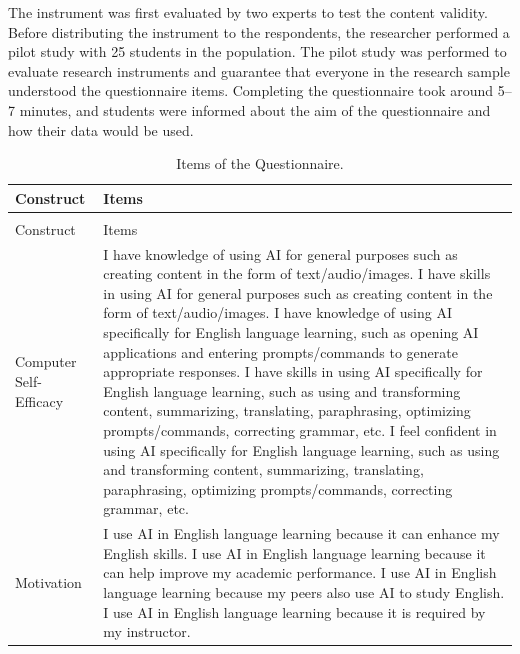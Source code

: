 \documentclass[english]{textolivre}
\begin{document}
The instrument was first evaluated by two experts to test the content validity. Before distributing the instrument to the respondents, the researcher performed a pilot study with 25 students in the population. The pilot study was performed to evaluate research instruments and guarantee that everyone in the research sample understood the questionnaire items. Completing the questionnaire took around 5–7 minutes, and students were informed about the aim of the questionnaire and how their data would be used.

\begin{center}
\begin{longtable}{>{\raggedright}p{3.5cm}p{11cm}}
\caption{Items of the Questionnaire.}
\label{tab3}\\
\toprule
\textbf{Construct} & \textbf{Items} \\
\midrule
\endfirsthead
\multicolumn{2}{l}{\tablename\ \thetable\ (continued)}\\
\toprule
Construct & Items \\
\midrule
\endhead
\bottomrule
\endfoot
Computer Self-Efficacy
&
I have knowledge of using AI for general purposes such as creating content in the form of text/audio/images.
\newline
I have skills in using AI for general purposes such as creating content in the form of text/audio/images.
\newline
I have knowledge of using AI specifically for English language learning, such as opening AI applications and entering prompts/commands to generate appropriate responses.
\newline
I have skills in using AI specifically for English language learning, such as using and transforming content, summarizing, translating, paraphrasing, optimizing prompts/commands, correcting grammar, etc.
\newline
I feel confident in using AI specifically for English language learning, such as using and transforming content, summarizing, translating, paraphrasing, optimizing prompts/commands, correcting grammar, etc.
\\[1.0em]

Motivation
&
I use AI in English language learning because it can enhance my English skills.
\newline
I use AI in English language learning because it can help improve my academic performance.
\newline
I use AI in English language learning because my peers also use AI to study English.
\newline
I use AI in English language learning because it is required by my instructor.
\\[1.0em]


\end{longtable}
\end{center}
\end{document}

